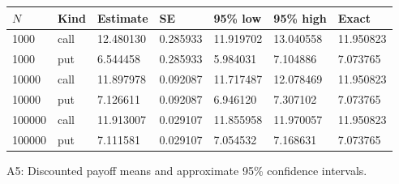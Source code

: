 \begin{center}
\small
\begin{tabular}{lllllll}
\toprule
$N$ & Kind & Estimate & SE & 95\% low & 95\% high & Exact\\
\midrule
1000 & call & 12.480130 & 0.285933 & 11.919702 & 13.040558 & 11.950823\\
1000 & put & 6.544458 & 0.285933 & 5.984031 & 7.104886 & 7.073765\\
10000 & call & 11.897978 & 0.092087 & 11.717487 & 12.078469 & 11.950823\\
10000 & put & 7.126611 & 0.092087 & 6.946120 & 7.307102 & 7.073765\\
100000 & call & 11.913007 & 0.029107 & 11.855958 & 11.970057 & 11.950823\\
100000 & put & 7.111581 & 0.029107 & 7.054532 & 7.168631 & 7.073765\\
\bottomrule
\end{tabular}
\par\smallskip A5: Discounted payoff means and approximate 95\% confidence intervals.
\end{center}